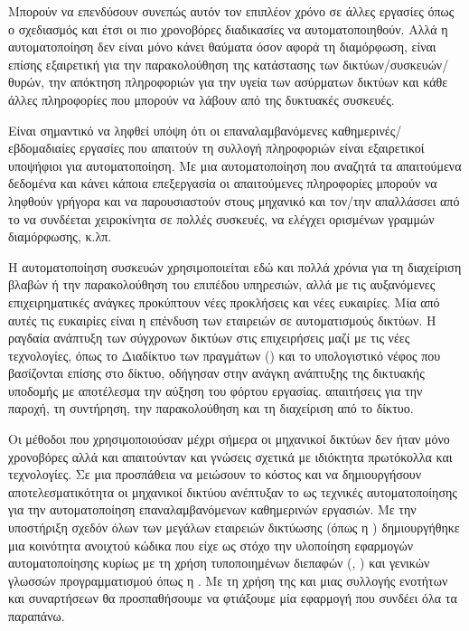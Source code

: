 Μπορούν να επενδύσουν συνεπώς αυτόν τον επιπλέον χρόνο σε άλλες εργασίες όπως ο σχεδιασμός και έτσι οι πιο χρονοβόρες διαδικασίες να αυτοματοποιηθούν. Αλλά η αυτοματοποίηση δεν είναι μόνο
κάνει θαύματα όσον αφορά τη διαμόρφωση, είναι επίσης εξαιρετική για την παρακολούθηση της κατάστασης των δικτύων/συσκευών/θυρών, την απόκτηση πληροφοριών για την υγεία των ασύρματων δικτύων και κάθε
άλλες πληροφορίες που μπορούν να λάβουν από της δυκτυακές συσκευές.

Είναι σημαντικό να ληφθεί υπόψη ότι οι επαναλαμβανόμενες καθημερινές/εβδομαδιαίες εργασίες
που απαιτούν τη συλλογή πληροφοριών είναι εξαιρετικοί υποψήφιοι για αυτοματοποίηση.
Με μια αυτοματοποίηση που αναζητά τα απαιτούμενα δεδομένα και κάνει κάποια επεξεργασία οι απαιτούμενες πληροφορίες μπορούν να ληφθούν γρήγορα και να παρουσιαστούν στους
μηχανικό και τον/την απαλλάσσει από το να συνδέεται χειροκίνητα σε πολλές συσκευές, να ελέγχει
ορισμένων γραμμών διαμόρφωσης, κ.λπ.

Η αυτοματοποίηση συσκευών χρησιμοποιείται εδώ και πολλά χρόνια για τη διαχείριση βλαβών ή την παρακολούθηση του επιπέδου υπηρεσιών, αλλά με τις αυξανόμενες επιχειρηματικές ανάγκες προκύπτουν νέες προκλήσεις και νέες ευκαιρίες. 
Μία από αυτές τις ευκαιρίες είναι η επένδυση των εταιρειών σε αυτοματισμούς δικτύων.
Η ραγδαία ανάπτυξη των σύγχρονων δικτύων στις επιχειρήσεις μαζί με τις νέες τεχνολογίες, 
όπως το Διαδίκτυο των πραγμάτων () και το υπολογιστικό νέφος που βασίζονται επίσης στο δίκτυο, οδήγησαν στην ανάγκη ανάπτυξης της δικτυακής υποδομής με αποτέλεσμα την αύξηση του φόρτου εργασίας. 
απαιτήσεις για την παροχή, τη συντήρηση, την παρακολούθηση και τη διαχείριση από το δίκτυο. 

Οι μέθοδοι που χρησιμοποιούσαν μέχρι σήμερα οι μηχανικοί δικτύων δεν ήταν μόνο χρονοβόρες αλλά και 
απαιτούνταν και γνώσεις σχετικά με ιδιόκτητα πρωτόκολλα και τεχνολογίες.
Σε μια προσπάθεια να μειώσουν το κόστος και να δημιουργήσουν αποτελεσματικότητα οι μηχανικοί δικτύου ανέπτυξαν το 
ως τεχνικές αυτοματοποίησης για την αυτοματοποίηση επαναλαμβανόμενων καθημερινών εργασιών.
Με την υποστήριξη σχεδόν όλων των μεγάλων εταιρειών δικτύωσης (όπως η ) δημιουργήθηκε μια κοινότητα ανοιχτού κώδικα που είχε ως στόχο την υλοποίηση εφαρμογών αυτοματοποίησης 
κυρίως με τη χρήση τυποποιημένων διεπαφών (, ) και γενικών γλωσσών προγραμματισμού όπως η .
Με τη χρήση της  και μιας συλλογής ενοτήτων και συναρτήσεων θα προσπαθήσουμε να φτιάξουμε μία εφαρμογή που συνδέει όλα τα παραπάνω.


